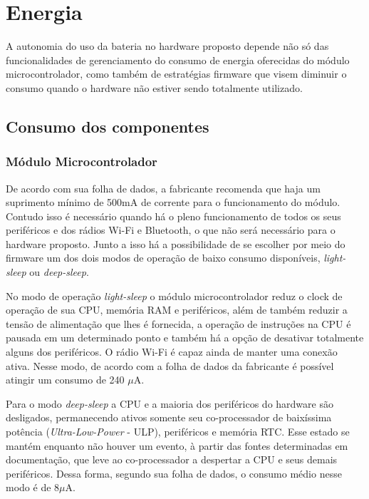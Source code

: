 \section{Energia}

A autonomia do uso da bateria no hardware proposto depende não só das funcionalidades de gerenciamento do consumo de energia oferecidas do módulo microcontrolador, como também de estratégias firmware que visem diminuir o consumo quando o hardware não estiver sendo totalmente utilizado. 

\subsection{Consumo dos componentes}

\subsubsection{Módulo Microcontrolador} 

De acordo com sua folha de dados, a fabricante recomenda que haja um suprimento mínimo de 500mA de corrente para o funcionamento do módulo. Contudo isso é necessário quando há o pleno funcionamento de todos os seus periféricos e dos rádios Wi-Fi e Bluetooth, o que não será necessário para o hardware proposto. Junto a isso há a possibilidade de se escolher por meio do firmware um dos dois modos de operação de baixo consumo disponíveis, \textit{light-sleep} ou \textit{deep-sleep}. 

No modo de operação \textit{light-sleep} o módulo microcontrolador reduz o clock de operação de sua CPU, memória RAM e periféricos, além de também reduzir a tensão de alimentação que lhes é fornecida, a operação de instruções na CPU é pausada em um determinado ponto e também há a opção de desativar totalmente alguns dos periféricos. O rádio Wi-Fi é capaz ainda de manter uma conexão ativa. Nesse modo, de acordo com a folha de dados da fabricante é possível atingir um consumo de 240 $\mu$A.

Para o modo \textit{deep-sleep} a CPU e a maioria dos periféricos do hardware são desligados, permanecendo ativos somente seu co-processador de baixíssima potência (\textit{Ultra-Low-Power} - ULP), periféricos e memória RTC. Esse estado se mantém enquanto não houver um evento, à partir das fontes determinadas em documentação, que leve ao co-processador a despertar a CPU e seus demais periféricos. Dessa forma, segundo sua folha de dados, o consumo médio nesse modo é de 8$\mu$A.

